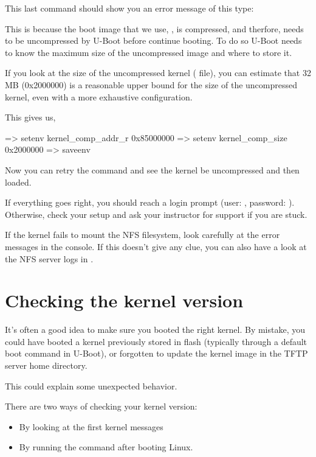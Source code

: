 This last command should show you an error message of this type:

This is because the boot image that we use, , is compressed, and
therfore, needs to be uncompressed by U-Boot before continue booting. To do so
U-Boot needs to know the maximum size of the uncompressed image and where to
store it.

If you look at the size of the uncompressed kernel ( file),
you can estimate that 32 MB (0x2000000) is a reasonable upper bound
for the size of the uncompressed kernel, even with a more exhaustive
configuration.

This gives us,

\begin{ubootinput}
=> setenv kernel_comp_addr_r 0x85000000
=> setenv kernel_comp_size 0x2000000
=> saveenv
\end{ubootinput}

Now you can retry the  command and see the kernel be uncompressed
and then loaded.

If everything goes right, you should reach a login prompt (user:
, password: ). Otherwise, check your setup and
ask your instructor for support if you are stuck.

If the kernel fails to mount the NFS filesystem, look carefully at the
error messages in the console. If this doesn't give any clue, you can
also have a look at the NFS server logs in .

\section{Checking the kernel version}

It's often a good idea to make sure you booted the right kernel.
By mistake, you could have booted a kernel previously stored in flash
(typically through a default boot command in U-Boot), or forgotten to
update the kernel image in the TFTP server home directory.

This could explain some unexpected behavior.

There are two ways of checking your kernel version:
\begin{itemize}
\item By looking at the first kernel messages
\item By running the  command after booting Linux.
\end{itemize}

